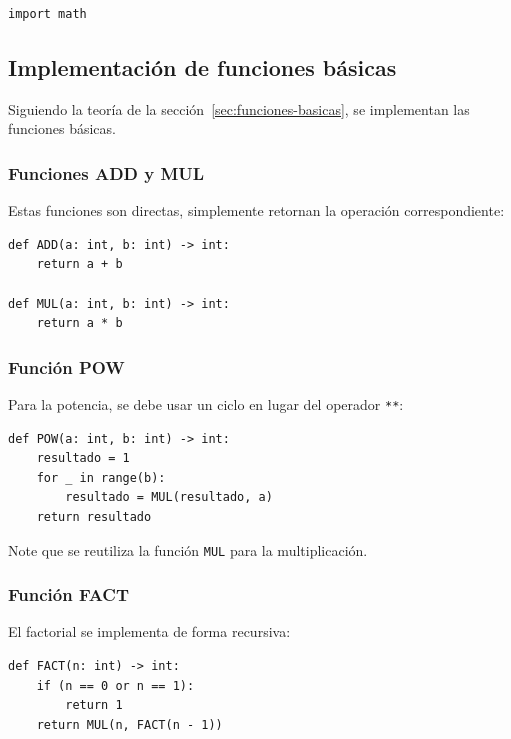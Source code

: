 \documentclass{article}
\begin{document}
\begin{lstlisting}[style=pythonstyle]
import math
\end{lstlisting}

\subsection{Implementación de funciones básicas}

Siguiendo la teoría de la sección~\ref{sec:funciones-basicas}, se implementan las funciones básicas.

\subsubsection{Funciones ADD y MUL}

Estas funciones son directas, simplemente retornan la operación correspondiente:

\begin{lstlisting}[style=pythonstyle]
def ADD(a: int, b: int) -> int:
    return a + b

def MUL(a: int, b: int) -> int:
    return a * b
\end{lstlisting}

\subsubsection{Función POW}

Para la potencia, se debe usar un ciclo en lugar del operador \texttt{**}:

\begin{lstlisting}[style=pythonstyle]
def POW(a: int, b: int) -> int:
    resultado = 1
    for _ in range(b):
        resultado = MUL(resultado, a)
    return resultado
\end{lstlisting}

Note que se reutiliza la función \texttt{MUL} para la multiplicación.

\subsubsection{Función FACT}

El factorial se implementa de forma recursiva:

\begin{lstlisting}[style=pythonstyle]
def FACT(n: int) -> int:
    if (n == 0 or n == 1):
        return 1
    return MUL(n, FACT(n - 1))
\end{lstlisting}
\end{document}
